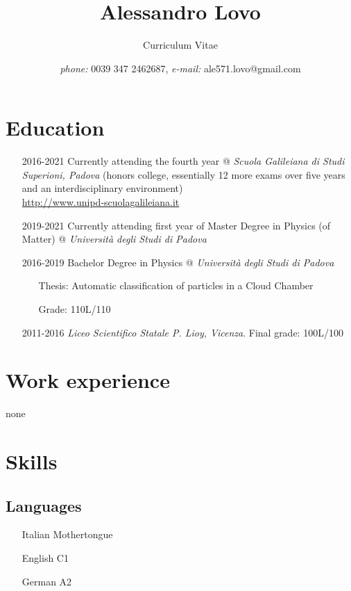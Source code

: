 \documentclass[11pt, a4 paper]{article}
\begin{document}
\title{Alessandro Lovo}
\date{\emph{phone:} 0039 347 2462687, \emph{e-mail:} ale571.lovo@gmail.com}
\author{Curriculum Vitae}
\maketitle

\section*{Education}
  \begin{itemize}
    \item[2016-2021] Currently attending the fourth year @ \emph{Scuola Galileiana di Studi Superioni, Padova} (honors college, essentially 12 more exams over five years and an interdisciplinary environment) \\
    \url{http://www.unipd-scuolagalileiana.it}
    \item[2019-2021] Currently attending first year of  Master Degree in Physics (of Matter) @ \emph{Università degli Studi di Padova}
    \item[2016-2019] Bachelor Degree in Physics @ \emph{Università degli Studi di Padova}
                    \begin{itemize}
                      \item[Thesis:] Automatic classification of particles in a Cloud Chamber
                      \item[Grade:] 110L/110
                    \end{itemize}
    \item[2011-2016] \emph{Liceo Scientifico Statale P. Lioy, Vicenza}. Final grade: 100L/100
  \end{itemize}

\section*{Work experience}
  none

\section*{Skills}
  \subsection*{Languages}
    \begin{multicols}{2}
      \begin{itemize}
        \item[Italian] Mothertongue
        \item[English] C1
        \item[German] A2
      \end{itemize}
    \end{multicols}
\end{document}

